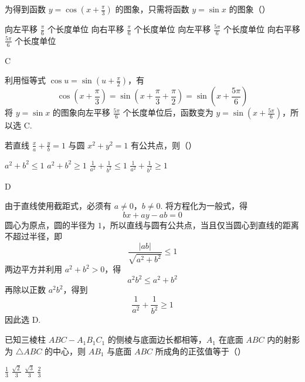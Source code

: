 \begin{problem}
为得到函数 \( y = \cos \left( x + \frac{\pi}{3} \right) \) 的图象，只需将函数 \( y = \sin x \) 的图象（\quad）

\choices
    {向左平移 \(\frac{\pi}{6}\) 个长度单位}
    {向右平移 \(\frac{\pi}{6}\) 个长度单位}
    {向左平移 \(\frac{5\pi}{6}\) 个长度单位}
    {向右平移 \(\frac{5\pi}{6}\) 个长度单位}
\end{problem}

\begin{answer}
C
\end{answer}

\begin{solution}
利用恒等式 \(\cos u=\sin\left(u+\frac{\pi}{2}\right)\)，有
\[
\cos\left(x+\frac{\pi}{3}\right)
=\sin\left(x+\frac{\pi}{3}+\frac{\pi}{2}\right)
=\sin\left(x+\frac{5\pi}{6}\right)
\]
将 \(y=\sin x\) 的图象向左平移 \(\frac{5\pi}{6}\) 个长度单位后，函数变为
\(y=\sin\left(x+\frac{5\pi}{6}\right)\)，所以选 C.
\end{solution}

\begin{problem}
若直线 \(\frac{x}{a} + \frac{y}{b} = 1\) 与圆 \(x^{2} + y^{2} = 1\) 有公共点，则（\quad）

\choices
    {\(a^2 + b^2 \leqslant 1\)}
    {\(a^2 + b^2 \geqslant 1\)}
    {\(\frac{1}{a^2} +\frac{1}{b^2}\leqslant 1\)}
    {\(\frac{1}{a^2} +\frac{1}{b^2}\geqslant 1\)}
\end{problem}

\begin{answer}
D
\end{answer}

\begin{solution}
由于直线使用截距式，必须有 \(a\ne0\)，\(b\ne0\). 将方程化为一般式，得
\[
bx+ay-ab=0
\]
圆心为原点，圆的半径为 \(1\)，所以直线与圆有公共点，当且仅当圆心到直线的距离不超过半径，即
\[
\frac{|ab|}{\sqrt{a^2+b^2}}\leqslant1
\]
两边平方并利用 \(a^2+b^2>0\)，得
\[
a^2b^2\leqslant a^2+b^2
\]
再除以正数 \(a^2b^2\)，得到
\[
\frac{1}{a^2}+\frac{1}{b^2}\geqslant1
\]
因此选 D.
\end{solution}

\begin{problem}
已知三棱柱 \(ABC - A_{1}B_{1}C_{1}\) 的侧棱与底面边长都相等，\(A_{1}\) 在底面 \(ABC\) 内的射影为 \(\triangle ABC\) 的中心，则 \(AB_{1}\) 与底面 \(ABC\) 所成角的正弦值等于（\quad）

\choices
    {\(\frac{1}{3}\)}
    {\(\frac{\sqrt{2}}{3}\)}
    {\(\frac{\sqrt{3}}{3}\)}
    {\(\frac{2}{3}\)}
\end{problem}

